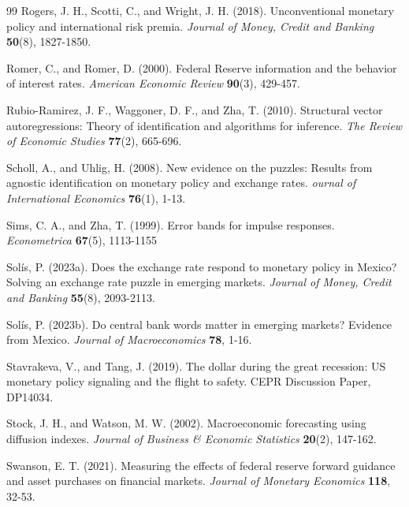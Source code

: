 \documentclass[12pt, reqno]{article}
\begin{document}
\begin{thebibliography}{99}
\bibitem{} \hypertarget{Rogers et al. (2018)}{} 
Rogers, J. H., Scotti, C., and Wright, J. H. (2018). Unconventional monetary policy and international risk premia. \textit{Journal of Money, Credit and Banking} \textbf{50}(8), 1827-1850.

\bibitem{} \hypertarget{Romer and Romer (2000)}{} 
Romer, C., and Romer, D. (2000). Federal Reserve information and the behavior of interest rates. \textit{American Economic Review} \textbf{90}(3), 429-457.

\bibitem{} \hypertarget{Rubio-Ramirez et al. (2010)}{} Rubio-Ramirez, J. F., Waggoner, D. F., and Zha, T. (2010). Structural vector autoregressions: Theory of identification and algorithms for inference. \textit{The Review of Economic Studies} \textbf{77}(2), 665-696.

\bibitem{} \hypertarget{Scholl and Uhlig (2008)}{} Scholl, A., and Uhlig, H. (2008). New evidence on the puzzles: Results from agnostic identification on monetary policy and exchange rates. \textit{ournal of International Economics} \textbf{76}(1), 1-13.


\bibitem{} \hypertarget{Sims and Zha (1999)}{} 
Sims, C. A., and Zha, T. (1999). Error bands for impulse responses. \textit{Econometrica} \textbf{67}(5), 1113-1155

\bibitem{} \hypertarget{Solis (2023a)}{}Solís, P. (2023a). Does the exchange rate respond to monetary policy in Mexico? Solving an exchange rate puzzle in emerging markets. \textit{Journal of Money, Credit and Banking} \textbf{55}(8), 2093-2113.

\bibitem{} \hypertarget{Solis (2023b)}{}Solís, P. (2023b). Do central bank words matter in emerging markets? Evidence from Mexico. \textit{Journal of Macroeconomics} \textbf{78}, 1-16.

\bibitem{} \hypertarget{Stavrakeva and Tang (2019)}{} 
Stavrakeva, V., and Tang, J. (2019). The dollar during the great recession: US monetary policy signaling and the flight to safety. CEPR Discussion Paper, DP14034.


\bibitem{} \hypertarget{Stock and Watson (2002)}{}Stock, J. H., and Watson, M. W. (2002). Macroeconomic forecasting using diffusion indexes. \textit{Journal of Business \& Economic Statistics} \textbf{}\textbf{20}(2), 147-162.

\bibitem{} \hypertarget{Swanson (2021)}{} 
Swanson, E. T. (2021). Measuring the effects of federal reserve forward guidance and asset purchases on financial markets. \textit{Journal of Monetary Economics} \textbf{118}, 32-53.


\end{thebibliography}
\end{document}
